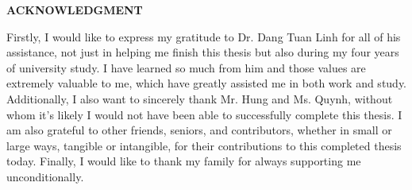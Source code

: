 \documentclass[../main.tex]{subfiles}
\begin{document}
\begin{center}
    \Large{\textbf{ACKNOWLEDGMENT}}\\
\end{center}
\vspace{1cm}
Firstly, I would like to express my gratitude to Dr. Dang Tuan Linh for all of his assistance, not just in helping me finish this thesis but also during my four years of university study. I have learned so much from him and those values are extremely valuable to me, which have greatly assisted me in both work and study. Additionally, I also want to sincerely thank Mr. Hung and Ms. Quynh, without whom it's likely I would not have been able to successfully complete this thesis. I am also grateful to other friends, seniors, and contributors, whether in small or large ways, tangible or intangible, for their contributions to this completed thesis today. Finally, I would like to thank my family for always supporting me unconditionally.
\end{document}
